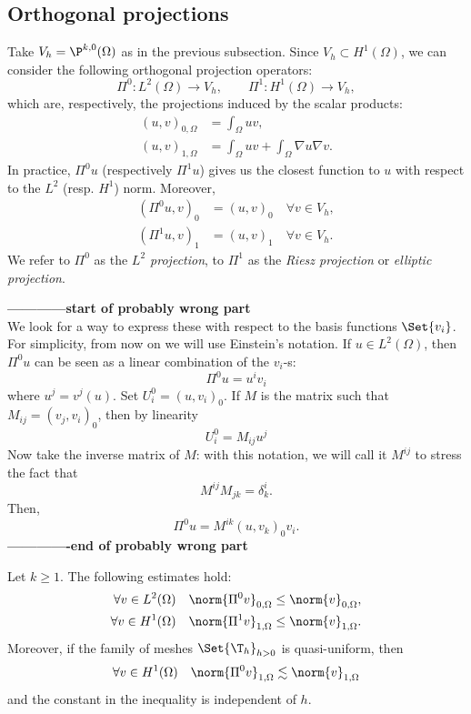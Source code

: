 \subsection{Orthogonal projections}

Take $V_h = \P^{k,0}(\Omega)$ as in the previous subsection. Since $V_h \subset H^1(\Omega)$, we can consider the following orthogonal projection operators:
\[
    \Pi^0: L^2(\Omega) \to V_h, \qquad
    \Pi^1: H^1(\Omega) \to V_h,
\]
which are, respectively, the projections induced by the scalar products:
\begin{align}
    (u,v)_{0,\Omega} &= \int_\Omega uv, \\
    (u,v)_{1,\Omega} &= \int_\Omega uv + \int_\Omega \nabla u \nabla v.
\end{align}
In practice, $\Pi^0 u$ (respectively $\Pi^1 u$) gives us the closest function to $u$ with respect to the $L^2$ (resp. $H^1$) norm. Moreover,
\begin{align}
    (\Pi^0 u, v)_0 &= (u, v)_0 \quad \forall v \in V_h, \\
    (\Pi^1 u, v)_1 &= (u, v)_1 \quad \forall v \in V_h.
\end{align}
We refer to $\Pi^0$ as the \emph{$L^2$ projection}, to $\Pi^1$ as the \emph{Riesz projection} or \emph{elliptic projection}.

\textbf{------------start of probably wrong part\\}
We look for a way to express these with respect to the basis functions $\Set{v_i}$. For simplicity, from now on we will use Einstein's notation. If $u \in L^2(\Omega)$, then $\Pi^0 u$ can be seen as a linear combination of the $v_i$-s:
\[
\Pi^0 u = u^i v_i
\]
where $u^j = v^j(u)$.
Set $U^0_i = (u,v_i)_0$. If $M$ is the matrix such that $M_{ij} = (v_j, v_i)_0$, then by linearity
\[
U^0_i = M_{ij} u^j
\]
Now take the inverse matrix of $M$: with this notation, we will call it $M^{ij}$ to stress the fact that
\[
M^{ij} M_{jk} = \delta^i_k.
\]
Then,
\[
\Pi^0 u = M^{ik} (u,v_k)_0 v_i.
\]
\textbf{-------------end of probably wrong part}

\begin{lemma}
    Let $k\ge1$. The following estimates hold:
    \begin{align}
        \forall v \in L^2(\Omega) \quad \norm{\Pi^0 v}_{0,\Omega} &\le \norm{v}_{0,\Omega}, \\
        \forall v \in H^1(\Omega) \quad \norm{\Pi^1 v}_{1,\Omega} &\le \norm{v}_{1,\Omega}.
    \end{align}
    Moreover, if the family of meshes $\Set{\T_h}_{h>0}$ is quasi-uniform, then
    \[
        \forall v \in H^1(\Omega) \quad \norm{\Pi^0 v}_{1,\Omega} \lesssim \norm{v}_{1,\Omega}
    \]
    and the constant in the inequality is independent of $h$.
\end{lemma}

